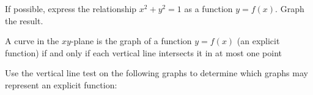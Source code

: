 \documentclass[../mathNotesPreamble]{subfiles}
\begin{document}
  \begin{ex*}
    If possible, express the relationship $x^2+y^2=1$ as a function $y=f(x)$. Graph the result.
  \end{ex*}
  \pagebreak

  \begin{defn*}
    A curve in the $xy$-plane is the graph of a function $y=f(x)$ (an explicit function) if and only if each vertical line intersects it in at most one point
  \end{defn*}

  \begin{ex*}
    Use the vertical line test on the following graphs to determine which graphs may represent an explicit function:
  \end{ex*}
\end{document}
